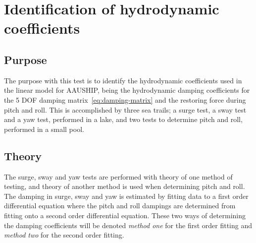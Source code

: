 \chapter{Identification of hydrodynamic coefficients}
\label{app:damping}

\section{Purpose}
The purpose with this test is to
identify the hydrodynamic coefficients used in the linear model for
AAUSHIP, being the hydrodynamic damping coefficients for the 5 \ac{DOF} damping
matrix~\vref{eq:damping-matrix} and the restoring force during pitch and roll. This is accomplished by
three sea trails; a surge test, a sway test and a yaw
test, performed in a lake, and two tests to determine pitch and roll, performed in a small pool.

\section{Theory}
The surge, sway and yaw tests are performed with theory of one method of testing, and theory of another method is used when determining pitch and roll. The damping in surge, sway and yaw is estimated by fitting data to a first order differential equation where the pitch and roll dampings are determined from fitting onto a second order differential equation. These two ways of determining the damping coefficients will be denoted \textit{method one} for the first order fitting and \textit{method two} for the second order fitting.

